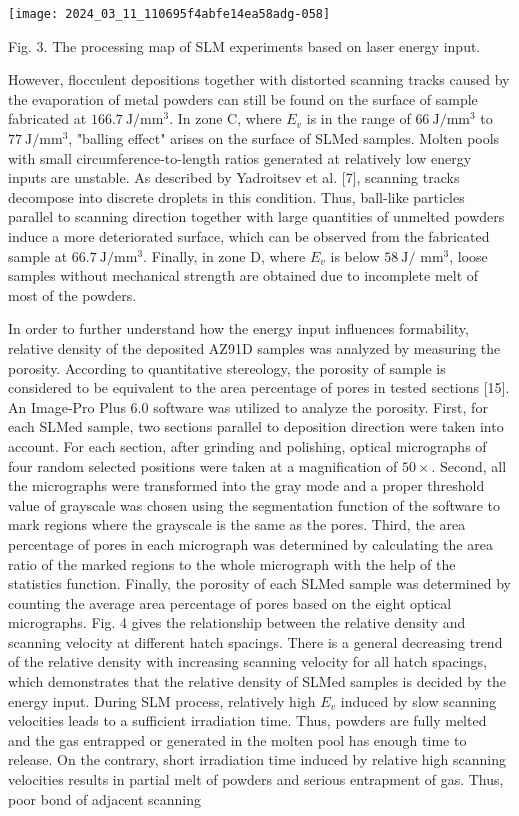 \documentclass[10pt]{article}
\begin{document}
\begin{center}
\texttt{[image: 2024\_03\_11\_110695f4abfe14ea58adg-058]}
\end{center}

Fig. 3. The processing map of SLM experiments based on laser energy input.

However, flocculent depositions together with distorted scanning tracks caused by the evaporation of metal powders can still be found on the surface of sample fabricated at $166.7 \mathrm{~J} / \mathrm{mm}^{3}$. In zone C, where $E_{v}$ is in the range of $66 \mathrm{~J} / \mathrm{mm}^{3}$ to $77 \mathrm{~J} / \mathrm{mm}^{3}$, "balling effect" arises on the surface of SLMed samples. Molten pools with small circumference-to-length ratios generated at relatively low energy inputs are unstable. As described by Yadroitsev et al. [7], scanning tracks decompose into discrete droplets in this condition. Thus, ball-like particles parallel to scanning direction together with large quantities of unmelted powders induce a more deteriorated surface, which can be observed from the fabricated sample at $66.7 \mathrm{~J} / \mathrm{mm}^{3}$. Finally, in zone D, where $E_{v}$ is below $58 \mathrm{~J} /$ $\mathrm{mm}^{3}$, loose samples without mechanical strength are obtained due to incomplete melt of most of the powders.

In order to further understand how the energy input influences formability, relative density of the deposited AZ91D samples was analyzed by measuring the porosity. According to quantitative stereology, the porosity of sample is considered to be equivalent to the area percentage of pores in tested sections [15]. An Image-Pro Plus 6.0 software was utilized to analyze the porosity. First, for each SLMed sample, two sections parallel to deposition direction were taken into account. For each section, after grinding and polishing, optical micrographs of four random selected positions were taken at a magnification of $50 \times$. Second, all the micrographs were transformed into the gray mode and a proper threshold value of grayscale was chosen using the segmentation function of the software to mark regions where the grayscale is the same as the pores. Third, the area percentage of pores in each micrograph was determined by calculating the area ratio of the marked regions to the whole micrograph with the help of the statistics function. Finally, the porosity of each SLMed sample was determined by counting the average area percentage of pores based on the eight optical micrographs. Fig. 4 gives the relationship between the relative density and scanning velocity at different hatch spacings. There is a general decreasing trend of the relative density with increasing scanning velocity for all hatch spacings, which demonstrates that the relative density of SLMed samples is decided by the energy input. During SLM process, relatively high $E_{v}$ induced by slow scanning velocities leads to a sufficient irradiation time. Thus, powders are fully melted and the gas entrapped or generated in the molten pool has enough time to release. On the contrary, short irradiation time induced by relative high scanning velocities results in partial melt of powders and serious entrapment of gas. Thus, poor bond of adjacent scanning
\end{document}
